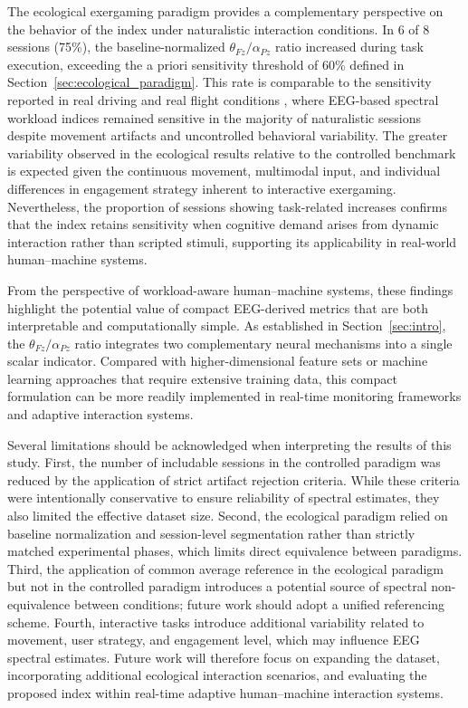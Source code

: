 \documentclass[10pt]{iopart}
\begin{document}
The ecological exergaming paradigm provides a complementary
perspective on the behavior of the index under naturalistic
interaction conditions. In 6 of 8 sessions (75\%), the
baseline-normalized $\theta_{Fz}/\alpha_{Pz}$ ratio increased
during task execution, exceeding the a priori sensitivity
threshold of 60\% defined in
Section~\ref{sec:ecological_paradigm}. This rate is comparable
to the sensitivity reported in real driving \cite{DiFlumeri2018_RealDrivingMWL}
and real flight conditions \cite{Dehais2019_RealFlightDryEEG},
where EEG-based spectral workload indices remained sensitive in
the majority of naturalistic sessions despite movement artifacts
and uncontrolled behavioral variability. The greater variability
observed in the ecological results relative to the controlled
benchmark is expected given the continuous movement, multimodal
input, and individual differences in engagement strategy inherent
to interactive exergaming. Nevertheless, the proportion of
sessions showing task-related increases confirms that the index
retains sensitivity when cognitive demand arises from dynamic
interaction rather than scripted stimuli, supporting its
applicability in real-world human--machine systems.

From the perspective of workload-aware human--machine systems, these findings highlight the potential value of compact EEG-derived metrics that are both interpretable and computationally simple. As established in Section~\ref{sec:intro}, the $\theta_{Fz}/\alpha_{Pz}$ ratio integrates two complementary neural mechanisms into a single scalar indicator. Compared with higher-dimensional feature sets or machine learning approaches that require extensive training data, this compact formulation can be more readily implemented in real-time monitoring frameworks and adaptive interaction systems.

Several limitations should be acknowledged when interpreting the results of this study. First, the number of includable sessions in the controlled paradigm was reduced by the application of strict artifact rejection criteria. While these criteria were intentionally conservative to ensure reliability of spectral estimates, they also limited the effective dataset size. Second, the ecological paradigm relied on baseline normalization and session-level segmentation rather than strictly matched experimental phases, which limits direct equivalence between paradigms. Third, the application of common average reference in the ecological paradigm but not in the controlled paradigm introduces a potential source of spectral non-equivalence between conditions; future work should adopt a unified referencing scheme. Fourth, interactive tasks introduce additional variability related to movement, user strategy, and engagement level, which may influence EEG spectral estimates. Future work will therefore focus on expanding the dataset, incorporating additional ecological interaction scenarios, and evaluating the proposed index within real-time adaptive human--machine interaction systems.
\end{document}

